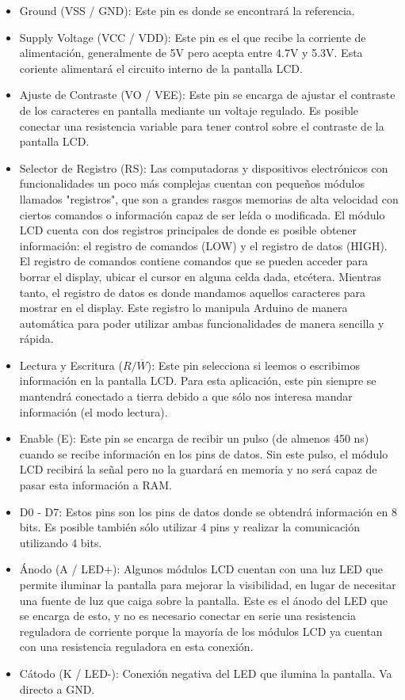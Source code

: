 \documentclass[12pt, letterpaper]{article}
\begin{document}
\begin{itemize}
	\item Ground (VSS / GND): Este pin es donde se encontrará la referencia.
		
	\item Supply Voltage (VCC / VDD): Este pin es el que recibe la corriente de alimentación, generalmente de 5V pero acepta entre 4.7V y 5.3V. Esta coriente alimentará el circuito interno de la pantalla LCD.

	\item Ajuste de Contraste (VO / VEE): Este pin se encarga de ajustar el contraste de los caracteres en pantalla mediante un voltaje regulado. Es posible conectar una resistencia variable para tener control sobre el contraste de la pantalla LCD.

	\item Selector de Registro (RS): Las computadoras y dispositivos electrónicos con funcionalidades un poco más complejas cuentan con pequeños módulos llamados "registros", que son a grandes rasgos memorias de alta velocidad con ciertos comandos o información capaz de ser leída o modificada. El módulo LCD cuenta con dos registros principales de donde es posible obtener información: el registro de comandos (LOW) y el registro de datos (HIGH). El registro de comandos contiene comandos que se pueden acceder para borrar el display, ubicar el cursor en alguna celda dada, etcétera. Mientras tanto, el registro de datos es donde mandamos aquellos caracteres para mostrar en el display. Este registro lo manipula Arduino de manera automática para poder utilizar ambas funcionalidades de manera sencilla y rápida.

	\item Lectura y Escritura ($R/\overline{W}$): Este pin selecciona si leemos o escribimos información en la pantalla LCD. Para esta aplicación, este pin siempre se mantendrá conectado a tierra debido a que sólo nos interesa mandar información (el modo lectura).

	\item Enable (E): Este pin se encarga de recibir un pulso (de almenos 450 ns) cuando se recibe información en los pins de datos. Sin este pulso, el módulo LCD recibirá la señal pero no la guardará en memoria y no será capaz de pasar esta información a RAM.

	\item D0 - D7: Estos pins son los pins de datos donde se obtendrá información en 8 bits. Es posible también sólo utilizar 4 pins y realizar la comunicación utilizando 4 bits.

	\item Ánodo (A / LED+): Algunos módulos LCD cuentan con una luz LED que permite iluminar la pantalla para mejorar la visibilidad, en lugar de necesitar una fuente de luz que caiga sobre la pantalla. Este es el ánodo del LED que se encarga de esto, y no es necesario conectar en serie una resistencia reguladora de corriente porque la mayoría de los módulos LCD ya cuentan con una resistencia reguladora en esta conexión.

	\item Cátodo (K / LED-): Conexión negativa del LED que ilumina la pantalla. Va directo a GND.
\end{itemize}
\end{document}
